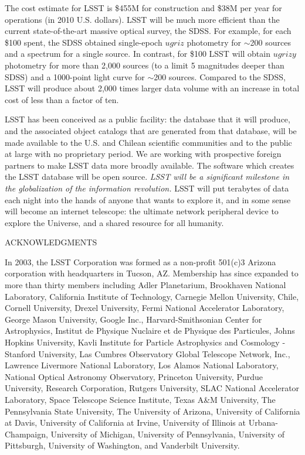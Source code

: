 \documentclass{emulateapj}
\newcommand{\B}[1]{{#1}}
\newcommand{\R}[1]{{\color{red}}}
\begin{document}
The cost estimate for LSST is \R{\$389M} \B{\$455M} for construction and 
\R{\$37M} \B{\$38M} per year for 
operations (in \R{2006} \B{2010} U.S. dollars). LSST will be much more 
efficient than the current state-of-the-art massive optical survey, the 
SDSS. For example, for each \$100 spent, the SDSS obtained 
single-epoch $ugriz$ photometry for $\sim$200 sources and a spectrum for 
a single source. In contrast, for \$100 LSST will obtain $ugrizy$ 
photometry for more than 2,000 sources (to a limit 5 magnitudes deeper 
than SDSS) and a 1000-point light curve for $\sim$200 sources. Compared
to the SDSS, LSST will produce about 2,000 times larger data volume with
an increase in total cost of less than a factor of ten.

LSST has been conceived as a public facility: the database that it will
produce, and the associated object catalogs that are generated from that
database, will be made available to the \R{world's} \B{U.S. and Chilean}
scientific communities and to the public at large with no proprietary period. 
\B{We are working with prospective foreign partners to make LSST data more broadly 
available}. 
The software which creates the LSST database will be open source. {\it LSST will 
be a significant milestone in the globalization of the information revolution.}
LSST will put terabytes of data each night into the hands of anyone that
wants to explore it, and in some sense will become an internet telescope:
the ultimate network peripheral device to explore the Universe, and
a shared resource for all humanity. 

\vskip 0.15in
\centerline{ACKNOWLEDGMENTS}

In 2003, the LSST Corporation was formed as a non-profit 501(c)3 Arizona corporation 
with headquarters in Tucson, AZ.  Membership has since expanded to more than thirty members including Adler Planetarium,
Brookhaven National Laboratory, California Institute of Technology,  Carnegie Mellon University, 
Chile,  Cornell University, Drexel University, Fermi National Accelerator Laboratory, 
George Mason University,
Google Inc., Harvard-Smithsonian Center for Astrophysics, Institut de Physique Nuclaire et de 
Physique des Particules, Johns Hopkins University, Kavli Institute for Particle Astrophysics and 
Cosmology - Stanford University, Las Cumbres Observatory Global Telescope Network, Inc., 
Lawrence Livermore National Laboratory, Los Alamos National Laboratory,  National Optical 
Astronomy Observatory, Princeton University, Purdue University, Research Corporation, 
Rutgers University, SLAC National Accelerator Laboratory,
Space Telescope Science Institute, 
Texas A\&M University, The Pennsylvania State University, The University of Arizona, University 
of California at Davis, University of California at Irvine, University of Illinois at Urbana-Champaign, 
University of Michigan, University of Pennsylvania, University of Pittsburgh, University of Washington, 
and Vanderbilt University. 
\end{document}
